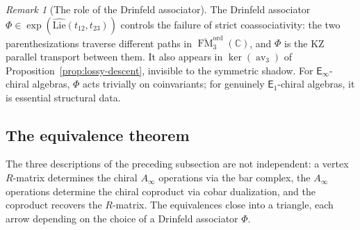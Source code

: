 \documentclass[11pt,reqno]{amsart}
\theoremstyle{definition}
\theoremstyle{remark}
\newtheorem{remark}[theorem]{Remark}
\newcommand{\Ainf}{A_{\infty}}
\newcommand{\Eone}{\mathsf{E}_{1}}
\newcommand{\Einf}{\mathsf{E}_{\infty}}
\newcommand{\Lie}{\mathrm{Lie}}
\DeclareMathOperator{\FM}{FM}
\DeclareMathOperator{\av}{av}
\newcommand{\CC}{\mathbb{C}}
\numberwithin{equation}{section}
\begin{document}
\begin{remark}[The role of the Drinfeld associator]
\label{rem:drinfeld-assoc-role}
The Drinfeld associator $\Phi \in \exp(\widehat{\Lie}(t_{12},
t_{23}))$ controls the failure of strict coassociativity:
the two parenthesizations traverse different paths in
$\overline{\FM}_3^{\mathrm{ord}}(\CC)$, and $\Phi$ is the
KZ parallel transport between them. It also appears in
$\ker(\av_3)$ of
Proposition~\ref{prop:lossy-descent},
invisible to the symmetric shadow. For $\Einf$-chiral
algebras, $\Phi$ acts trivially on coinvariants; for genuinely
$\Eone$-chiral algebras, it is essential structural data.
\end{remark}


\subsection{The equivalence theorem}
\label{subsec:equiv-thm}

The three descriptions of the preceding subsection are not
independent: a vertex $R$-matrix determines the chiral
$\Ainf$ operations via the bar complex, the $\Ainf$
operations determine the chiral coproduct via cobar
dualization, and the coproduct recovers the $R$-matrix.
The equivalences close into a triangle, each arrow depending
on the choice of a Drinfeld associator $\Phi$.
\end{document}

